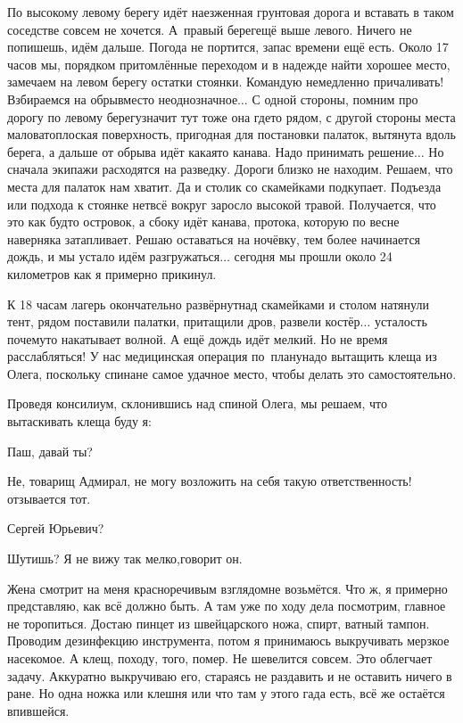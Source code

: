 По высокому левому берегу идёт наезженная грунтовая дорога и вставать в таком соседстве совсем не хочется. А~правый берег\mdash ещё выше левого. Ничего не попишешь, идём дальше. Погода не портится, запас времени ещё есть. Около 17 часов мы, порядком притомлённые переходом и в надежде найти хорошее место, замечаем на левом берегу остатки стоянки. Командую немедленно причаливать! Взбираемся на обрыв\mdash место неоднозначное$\ldots$ С одной стороны, помним про дорогу по левому берегу\mdash значит тут тоже она где\sdash то рядом, с другой стороны места маловато\mdash плоская поверхность, пригодная для постановки палаток, вытянута вдоль берега, а дальше от обрыва идёт какая\sdash то канава. Надо принимать решение$\ldots$ Но сначала экипажи расходятся на разведку. Дороги близко не находим. Решаем, что места для палаток нам хватит. Да и столик со скамейками подкупает. Подъезда или подхода к стоянке нет\mdash всё вокруг заросло высокой травой. Получается, что это как будто островок, а сбоку идёт канава, протока, которую по весне наверняка затапливает. Решаю оставаться на ночёвку, тем более начинается дождь, и мы устало идём разгружаться$\ldots$ сегодня мы прошли около 24 километров как я примерно прикинул.

К 18 часам лагерь окончательно развёрнут\mdash над скамейками и столом натянули тент, рядом поставили палатки, притащили дров, развели костёр$\ldots$ усталость почему\sdash то накатывает волной. А ещё дождь идёт мелкий. Но не время расслабляться! У нас медицинская операция по~плану\mdash надо вытащить клеща из Олега, поскольку спина\mdash не самое удачное место, чтобы делать это самостоятельно. 

Проведя консилиум, склонившись над спиной Олега, мы решаем, что вытаскивать клеща буду я:

\diagdash Паш, давай ты?

\diagdash Не, товарищ Адмирал, не могу возложить на себя такую ответственность!\mdash отзывается тот.

\diagdash Сергей Юрьевич?

\diagdash Шутишь? Я не вижу так мелко,\mdash говорит он.

Жена смотрит на меня красноречивым взглядом\mdash не возьмётся. Что ж, я примерно представляю, как всё должно быть. А там уже по ходу дела посмотрим, главное не торопиться. Достаю пинцет из швейцарского ножа, спирт, ватный тампон. Проводим дезинфекцию инструмента, потом я принимаюсь выкручивать мерзкое насекомое. А клещ, походу, того, помер. Не шевелится совсем. Это облегчает задачу. Аккуратно выкручиваю его, стараясь не раздавить и не оставить ничего в ране. Но одна ножка или клешня или что там у этого гада есть, всё же остаётся впившейся. 

